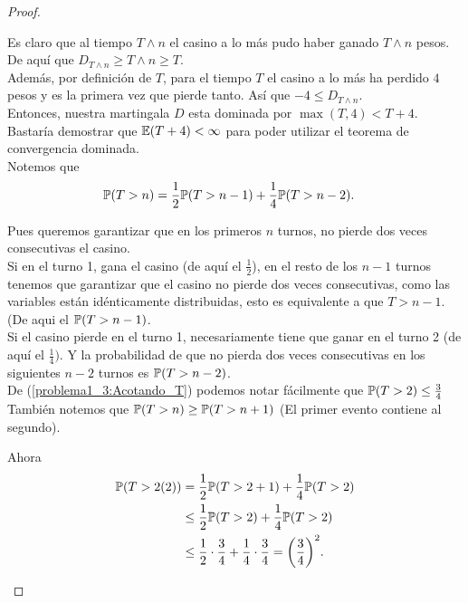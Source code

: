 \begin{proof}
\begin{enumerate}
		    Es claro que al tiempo $T \wedge n$ el casino a lo más pudo haber ganado $T \wedge n$ pesos.
		    De aquí que $D_{T \wedge n} \geq T \wedge n \geq T$.\\
		    
		    Además, por definición de $T$, para el tiempo $T$ el casino a lo más ha perdido $4$ pesos y es la primera vez que 
		    pierde tanto. Así que $-4 \leq D_{T \wedge n}$.\\ 
		    
			Entonces, nuestra martingala $D$ esta dominada por $\max(T, 4) < T + 4$. Bastaría demostrar que $\mathbb{E}(T+4) < \infty$ para poder
			utilizar el teorema de convergencia dominada.\\
			
			Notemos que 
			\begin{align}\label{problema1_3:Acotando_T}
				\mathbb{P}(T > n) &= \frac{1}{2} \mathbb{P}(T > n-1) + \frac{1}{4} \mathbb{P}(T > n-2). 
			\end{align}
			
			Pues queremos garantizar que en los primeros $n$ turnos, no pierde dos veces consecutivas el casino.\\
			
			Si en el turno 1, gana el casino (de aquí el $\frac{1}{2}$), en el resto de los $n-1$ turnos tenemos que garantizar que 
			el casino no pierde dos veces consecutivas, como las variables están idénticamente distribuidas, esto es equivalente a que
			$T>n-1$. (De aqui el $\mathbb{P}(T > n-1)$.\\
			
			Si el casino pierde en el turno 1, necesariamente tiene que ganar en el turno 2 (de aquí el $\frac{1}{4})$. Y la probabilidad
			de que no pierda dos veces consecutivas en los siguientes $n-2$ turnos es $\mathbb{P}(T > n-2)$.\\					    
		    
		    De (\ref{problema1_3:Acotando_T}) podemos notar fácilmente que $\mathbb{P}(T > 2) \leq \frac{3}{4}$\\
		    
		    También notemos que $\mathbb{P}(T > n ) \geq \mathbb{P}(T > n + 1)$ (El primer evento contiene al segundo).
		    
		    Ahora
		    \begin{align}
		       	\mathbb{P}(T > 2 (2)) &=     \frac{1}{2} \mathbb{P}(T > 2+1) + \frac{1}{4} \mathbb{P}(T > 2) \\
		       				   &\leq  \frac{1}{2} \mathbb{P}(T > 2) + \frac{1}{4} \mathbb{P}(T > 2) \\
		       				   &\leq  \frac{1}{2} \cdot \frac{3}{4} + \frac{1}{4} \cdot \frac{3}{4} = \bigg(\frac{3}{4}\bigg)^2.
		    \end{align}
		    

\end{enumerate}
\end{proof}

